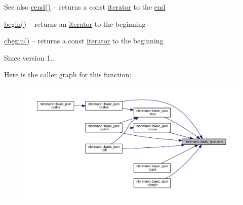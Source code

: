 \begin{DoxySeeAlso}{See also}
\mbox{\hyperlink{classnlohmann_1_1basic__json_a8dba7b7d2f38e6b0c614030aa43983f6}{cend()}} -- returns a const \mbox{\hyperlink{classnlohmann_1_1basic__json_a099316232c76c034030a38faa6e34dca}{iterator}} to the \mbox{\hyperlink{classnlohmann_1_1basic__json_a13e032a02a7fd8a93fdddc2fcbc4763c}{end}} 

\mbox{\hyperlink{classnlohmann_1_1basic__json_a0ff28dac23f2bdecee9564d07f51dcdc}{begin()}} -- returns an \mbox{\hyperlink{classnlohmann_1_1basic__json_a099316232c76c034030a38faa6e34dca}{iterator}} to the beginning 

\mbox{\hyperlink{classnlohmann_1_1basic__json_ad865d6c291b237ae508d5cb2146b5877}{cbegin()}} -- returns a const \mbox{\hyperlink{classnlohmann_1_1basic__json_a099316232c76c034030a38faa6e34dca}{iterator}} to the beginning
\end{DoxySeeAlso}
\begin{DoxySince}{Since}
version 1.. 
\end{DoxySince}
Here is the caller graph for this function\+:
\nopagebreak
\begin{figure}[H]
\begin{center}
\leavevmode
\includegraphics[width=350pt]{classnlohmann_1_1basic__json_a13e032a02a7fd8a93fdddc2fcbc4763c_icgraph}
\end{center}
\end{figure}
\mbox{\label{classnlohmann_1_1basic__json_a1c15707055088cd5436ae91db72cbe67}} 
